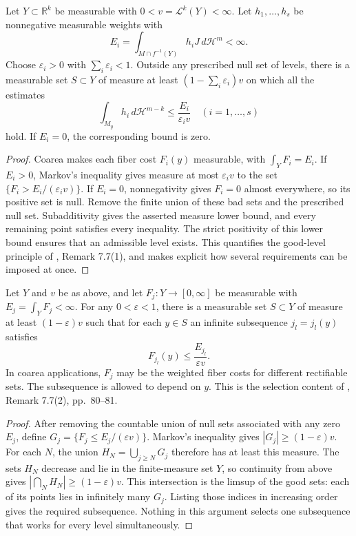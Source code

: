 \begin{proposition}\label{prop:coarea-simultaneous-level-selection}
Let $Y\subset\mathbb R^k$ be measurable with $0<v=\mathcal L^k(Y)<\infty$. Let $h_1,\ldots,h_s$ be nonnegative measurable weights with
\[
 E_i=\int_{M\cap f^{-1}(Y)}h_iJ\,d\mathcal H^m<\infty.
\]
Choose $\varepsilon_i>0$ with $\sum_i\varepsilon_i<1$. Outside any prescribed null set of levels, there is a measurable set $S\subset Y$ of measure at least $(1-\sum_i\varepsilon_i)v$ on which all the estimates
\[
 \int_{M_y}h_i\,d\mathcal H^{m-k}\leq\frac{E_i}{\varepsilon_i v}
 \quad(i=1,\ldots,s)
\]
hold. If $E_i=0$, the corresponding bound is zero.
\end{proposition}
\begin{proof}
Coarea makes each fiber cost $F_i(y)$ measurable, with $\int_YF_i=E_i$. If $E_i>0$, Markov's inequality gives measure at most $\varepsilon_i v$ to the set $\{F_i>E_i/(\varepsilon_i v)\}$. If $E_i=0$, nonnegativity gives $F_i=0$ almost everywhere, so its positive set is null. Remove the finite union of these bad sets and the prescribed null set. Subadditivity gives the asserted measure lower bound, and every remaining point satisfies every inequality. The strict positivity of this lower bound ensures that an admissible level exists. This quantifies the good-level principle of \cite{Sim18}, Remark 7.7(1), and makes explicit how several requirements can be imposed at once.
\end{proof}

\begin{proposition}\label{prop:coarea-subsequence-good-levels}
Let $Y$ and $v$ be as above, and let $F_j:Y\to[0,\infty]$ be measurable with $E_j=\int_YF_j<\infty$. For any $0<\varepsilon<1$, there is a measurable set $S\subset Y$ of measure at least $(1-\varepsilon)v$ such that for each $y\in S$ an infinite subsequence $j_l=j_l(y)$ satisfies
\[
 F_{j_l}(y)\leq\frac{E_{j_l}}{\varepsilon v}.
\]
In coarea applications, $F_j$ may be the weighted fiber costs for different rectifiable sets. The subsequence is allowed to depend on $y$. This is the selection content of \cite{Sim18}, Remark 7.7(2), pp.~80--81.
\end{proposition}
\begin{proof}
After removing the countable union of null sets associated with any zero $E_j$, define $G_j=\{F_j\leq E_j/(\varepsilon v)\}$. Markov's inequality gives $|G_j|\geq(1-\varepsilon)v$. For each $N$, the union $H_N=\bigcup_{j\geq N}G_j$ therefore has at least this measure. The sets $H_N$ decrease and lie in the finite-measure set $Y$, so continuity from above gives $|\bigcap_NH_N|\geq(1-\varepsilon)v$. This intersection is the limsup of the good sets: each of its points lies in infinitely many $G_j$. Listing those indices in increasing order gives the required subsequence. Nothing in this argument selects one subsequence that works for every level simultaneously.
\end{proof}


